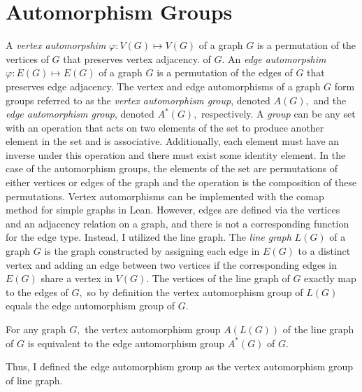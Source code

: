 \documentclass{article}
\begin{document}
\section{Automorphism Groups}
A \textit{vertex automorpshim} $\varphi : V(G) \mapsto V(G)$ of a graph $G$ is a permutation of the vertices of $G$ that preserves vertex adjacency. of $G.$ An \textit{edge automorpshim} $\varphi : E(G) \mapsto E(G)$ of a graph $G$ is a permutation of the edges of $G$ that preserves edge adjacency. The vertex and edge automorphisms of a graph $G$ form groups referred to as the \textit{vertex automorphism group}, denoted $A(G),$ and the \textit{edge automorphism group}, denoted $A^*(G),$ respectively. A \textit{group} can be any set with an operation that acts on two elements of the set to produce another element in the set and is associative. Additionally, each element must have an inverse under this operation and there must exist some identity element. In the case of the automorphism groups, the elements of the set are permutations of either vertices or edges of the graph and the operation is the composition of these permutations. Vertex automorphisms can be implemented with the {\sc comap} method for simple graphs in Lean. However, edges are defined via the vertices and an adjacency relation on a graph, and there is not a corresponding function for the edge type. Instead, I utilized the line graph. The \textit{line graph} $L(G)$ of a graph $G$ is the graph constructed by assigning each edge in $E(G)$ to a distinct vertex and adding an edge between two vertices if the corresponding edges in $E(G)$ share a vertex in $V(G).$ The vertices of the line graph of $G$ exactly map to the edges of $G,$ so by definition the vertex automorphism group of $L(G)$ equals the edge automorphism group of $G.$
\begin{cor}\label{cor:lineedge}
    For any graph $G,$ the vertex automorphism group $A(L(G))$ of the line graph of $G$ is equivalent to the edge automorphism group $A^*(G)$ of $G.$
\end{cor}
\noindent Thus, I defined the edge automorphism group as the vertex automorphism group of line graph.
\end{document}
